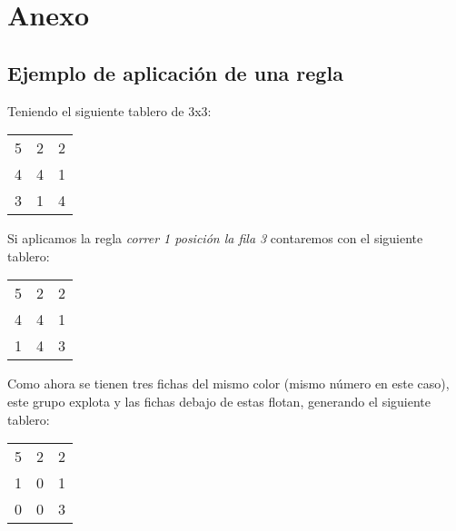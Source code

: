 \documentclass[%
    final,
    reprint,
    notitlepage,
    narroweqnarray,
    inline,
    twoside,
    invited
    ]{ieee}
\begin{document}
\section{Anexo}
\subsection{Ejemplo de aplicaci\'on de una regla}\label{anexo:ejemplo}
Teniendo el siguiente tablero de 3x3:
\begin{center}
\begin{tabular}{ l c r }
  5 & 2 & 2 \\
  4 & 4 & 1 \\
  3 & 1 & 4 \\
\end{tabular}
\end{center}
\par Si aplicamos la regla \emph{correr 1 posici\'on la fila 3} contaremos con el siguiente tablero: \\
\begin{center}
\begin{tabular}{ l c r }
  5 & 2 & 2 \\
  4 & 4 & 1 \\
  1 & 4 & 3 \\
\end{tabular}
\end{center}
\par Como ahora se tienen tres fichas del mismo color (mismo n\'umero en este caso), este grupo explota y las fichas debajo de estas flotan, generando el siguiente tablero:
\begin{center}
\begin{tabular}{ l c r }
  5 & 2 & 2 \\
  1 & 0 & 1 \\
  0 & 0 & 3 \\
\end{tabular}
\end{center}
\end{document}
